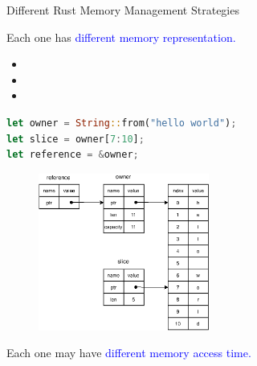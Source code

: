 \documentclass[9pt]{beamer}
\begin{document}
\begin{frame}[fragile]{Different Rust Memory Management Strategies}

    Each one has \textcolor{blue}{different memory representation.}

\begin{minipage}{0.3\linewidth}
\centering
\begin{itemize}
\item {} 
\item {}
\item {}
\end{itemize}
\end{minipage}\hfill
\begin{minipage}{0.6\linewidth}
\centering
\begin{lstlisting}[language=Rust]
let owner = String::from("hello world");
let slice = owner[7:10];
let reference = &owner;
\end{lstlisting}
\end{minipage}     

    \begin{minipage}{1.0\linewidth}
        \begin{figure}[hp]
            \centering
            \begin{center}
                    \includegraphics[width=0.5\textwidth]{images/own_ref_slice.eps}
                    \captionsetup{labelformat=empty}
            \end{center}
        \end{figure}
    \end{minipage}      
    
    Each one may have \textcolor{blue}{different memory access time.}
\end{frame}

\end{document}
